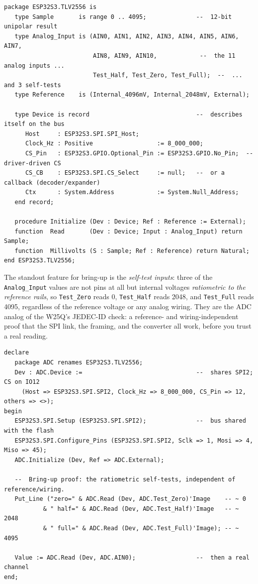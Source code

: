\begin{lstlisting}
package ESP32S3.TLV2556 is
   type Sample       is range 0 .. 4095;              --  12-bit unipolar result
   type Analog_Input is (AIN0, AIN1, AIN2, AIN3, AIN4, AIN5, AIN6, AIN7,
                         AIN8, AIN9, AIN10,            --  the 11 analog inputs ...
                         Test_Half, Test_Zero, Test_Full);  --  ... and 3 self-tests
   type Reference    is (Internal_4096mV, Internal_2048mV, External);

   type Device is record                              --  describes itself on the bus
      Host     : ESP32S3.SPI.SPI_Host;
      Clock_Hz : Positive                  := 8_000_000;
      CS_Pin   : ESP32S3.GPIO.Optional_Pin := ESP32S3.GPIO.No_Pin;  -- driver-driven CS
      CS_CB    : ESP32S3.SPI.CS_Select     := null;   --  or a callback (decoder/expander)
      Ctx      : System.Address            := System.Null_Address;
   end record;

   procedure Initialize (Dev : Device; Ref : Reference := External);
   function  Read       (Dev : Device; Input : Analog_Input) return Sample;
   function  Millivolts (S : Sample; Ref : Reference) return Natural;
end ESP32S3.TLV2556;
\end{lstlisting}

The standout feature for bring-up is the \emph{self-test inputs}: three of the
\texttt{Analog\_Input} values are not pins at all but internal voltages
\emph{ratiometric to the reference rails}, so \texttt{Test\_Zero} reads 0,
\texttt{Test\_Half} reads 2048, and \texttt{Test\_Full} reads 4095, regardless
of the reference voltage or any analog wiring. They are the ADC analog of the
W25Q's JEDEC-ID check: a reference- and wiring-independent proof that the SPI link,
the framing, and the converter all work, before you trust a real reading.

\begin{lstlisting}
declare
   package ADC renames ESP32S3.TLV2556;
   Dev : ADC.Device :=                                --  shares SPI2; CS on IO12
     (Host => ESP32S3.SPI.SPI2, Clock_Hz => 8_000_000, CS_Pin => 12, others => <>);
begin
   ESP32S3.SPI.Setup (ESP32S3.SPI.SPI2);              --  bus shared with the flash
   ESP32S3.SPI.Configure_Pins (ESP32S3.SPI.SPI2, Sclk => 1, Mosi => 4, Miso => 45);
   ADC.Initialize (Dev, Ref => ADC.External);

   --  Bring-up proof: the ratiometric self-tests, independent of reference/wiring.
   Put_Line ("zero=" & ADC.Read (Dev, ADC.Test_Zero)'Image    -- ~ 0
           & " half=" & ADC.Read (Dev, ADC.Test_Half)'Image   -- ~ 2048
           & " full=" & ADC.Read (Dev, ADC.Test_Full)'Image); -- ~ 4095

   Value := ADC.Read (Dev, ADC.AIN0);                 --  then a real channel
end;
\end{lstlisting}

